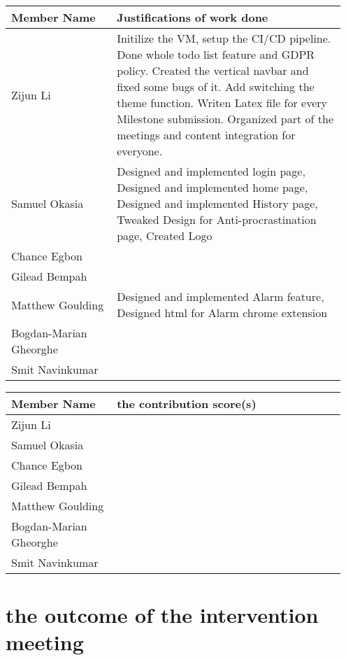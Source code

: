 \documentclass[a4paper]{article}
\begin{document}
{\noindent\begin{tabular}{|p{0.3\linewidth}|p{0.65\linewidth}|} 
	\hline
 \textbf{Member Name} & \textbf{Justifications of work done} \\
 \hline
 Zijun Li & Initilize the VM, setup the CI/CD pipeline. Done whole todo list feature and GDPR policy. Created the vertical navbar and fixed some bugs of it. Add switching the theme function. Writen Latex file for every Milestone submission. Organized part of the meetings and content integration for everyone. \\
 \hline
 Samuel Okasia & Designed and implemented login page, Designed and implemented home page, Designed and implemented History page, Tweaked Design for Anti-procrastination page, Created Logo\\
 \hline
 Chance Egbon & \\
 \hline
 Gilead Bempah & \\
 \hline
 Matthew Goulding& Designed and implemented Alarm feature, Designed html for Alarm chrome extension\\
 \hline
 Bogdan-Marian Gheorghe & \\
 \hline
 Smit Navinkumar& \\
 \hline
\end{tabular}}

{\noindent\begin{tabular}{|p{0.3\linewidth}|p{0.65\linewidth}|} 
	\hline
 \textbf{Member Name} & \textbf{ the contribution score(s) } \\
 \hline
 Zijun Li & \\
 \hline
 Samuel Okasia & \\
 \hline
 Chance Egbon & \\
 \hline
 Gilead Bempah & \\
 \hline
 Matthew Goulding& \\
 \hline
 Bogdan-Marian Gheorghe & \\
 \hline
 Smit Navinkumar& \\
 \hline
\end{tabular}}

\section*{the outcome of the intervention meeting}
\end{document}
